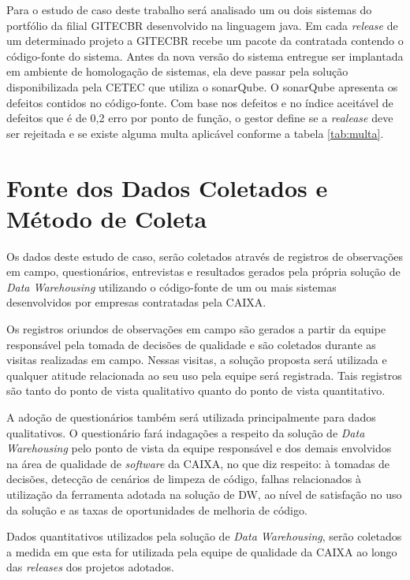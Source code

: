 	
Para o estudo de caso deste trabalho será analisado um ou dois sistemas do portfólio da filial GITECBR desenvolvido na linguagem java. Em cada \textit{release} de um determinado projeto a GITECBR recebe um pacote da contratada contendo o código-fonte do sistema. Antes da nova versão do sistema entregue ser implantada em ambiente de homologação de sistemas, ela deve passar pela solução disponibilizada pela CETEC que utiliza o sonarQube. O sonarQube apresenta os defeitos contidos no código-fonte. Com base nos defeitos e no índice aceitável de defeitos que é de 0,2 erro por ponto de função, o gestor define se a \textit{realease} deve ser rejeitada e se existe alguma multa aplicável conforme a tabela \ref{tab:multa}.    


\section{Fonte dos Dados Coletados e Método de Coleta}
\label{sec:fonte} 

Os dados deste estudo de caso, serão coletados através de registros de observações em campo, questionários, entrevistas e resultados gerados pela própria solução de \textit{Data Warehousing} utilizando o código-fonte de um ou mais sistemas desenvolvidos por empresas contratadas pela CAIXA.

Os registros oriundos de observações em campo são gerados a partir da equipe responsável pela tomada de decisões de qualidade e são coletados durante as visitas realizadas em campo. Nessas visitas, a solução proposta será utilizada e qualquer atitude relacionada ao seu uso pela equipe será registrada. Tais registros são tanto do ponto de vista qualitativo quanto do ponto de vista quantitativo.

A adoção de questionários também será utilizada principalmente para dados qualitativos. O questionário fará indagações a respeito da solução de \textit{Data Warehousing} pelo ponto de vista da equipe responsável e dos demais envolvidos na área de qualidade de \textit{software} da CAIXA, no que diz respeito: à tomadas de decisões, detecção de cenários de limpeza de código, falhas relacionados à utilização da ferramenta adotada na solução de DW, ao nível de satisfação no uso da solução e as taxas de oportunidades de melhoria de código. 

Dados quantitativos utilizados pela solução de \textit{Data Warehousing}, serão coletados a medida em que esta for utilizada pela equipe de qualidade da CAIXA ao longo das \textit{releases} dos projetos adotados.

